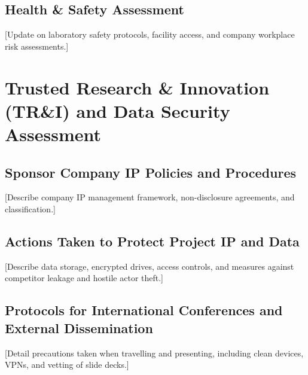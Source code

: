 \documentclass[year2]{../idcore-ar}
\begin{document}
\subsection{Health \& Safety Assessment}

[Update on laboratory safety protocols, facility access, and company workplace risk assessments.]


\section{Trusted Research \& Innovation (TR\&I) and Data Security Assessment}

\subsection{Sponsor Company IP Policies and Procedures}
[Describe company IP management framework, non-disclosure agreements, and classification.]

\subsection{Actions Taken to Protect Project IP and Data}
[Describe data storage, encrypted drives, access controls, and measures against competitor leakage and hostile actor theft.]

\subsection{Protocols for International Conferences and External Dissemination}
[Detail precautions taken when travelling and presenting, including clean devices, VPNs, and vetting of slide decks.]
\end{document}
